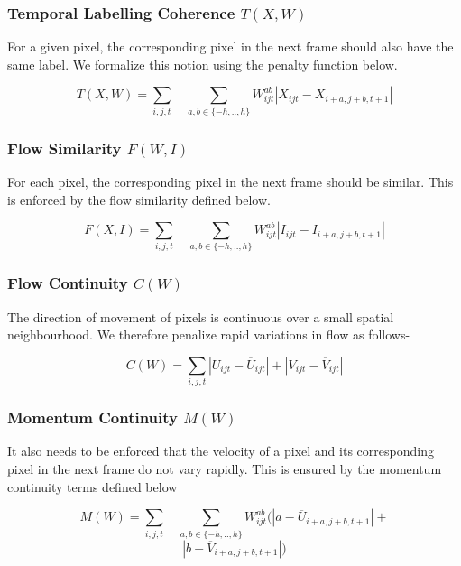 \subsubsection*{Temporal Labelling Coherence $T(X,W)$}

For a given pixel, the corresponding pixel in the next frame should
also have the same label. We formalize this notion using the penalty
function below.

\begin{equation}
T(X,W)=\underset{i,j,t}{\sum}\quad\underset{a,b\in\{-h,..,h\}}{\sum}W_{ijt}^{ab}|X_{ijt}-X_{i+a,j+b,t+1}|
\end{equation}



\subsubsection*{Flow Similarity $F(W,I)$}

For each pixel, the corresponding pixel in the next frame should be
similar. This is enforced by the flow similarity defined below.

\begin{equation}
F(X,I)=\underset{i,j,t}{\sum}\quad\underset{a,b\in\{-h,..,h\}}{\sum}W_{ijt}^{ab}|I_{ijt}-I_{i+a,j+b,t+1}|
\end{equation}



\subsubsection*{Flow Continuity $C(W)$}

The direction of movement of pixels is continuous over a small spatial
neighbourhood. We therefore penalize rapid variations in flow as follows-

\begin{equation}
C(W)=\underset{i,j,t}{\sum}|U_{ijt}-\overline{U}_{ijt}|+|V_{ijt}-\overline{V}_{ijt}|
\end{equation}



\subsubsection*{Momentum Continuity $M(W)$}

It also needs to be enforced that the velocity of a pixel and its
corresponding pixel in the next frame do not vary rapidly. This is
ensured by the momentum continuity terms defined below

\begin{equation}
M(W)=\underset{i,j,t}{\sum}\quad\underset{a,b\in\{-h,..,h\}}{\sum}W_{ijt}^{ab}(|a-\overline{U}_{i+a,j+b,t+1}|+
\end{equation}
\[|b-\overline{V}_{i+a,j+b,t+1}|)
\]



